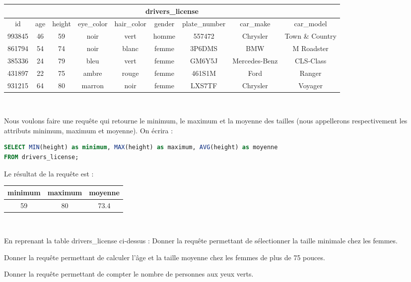 \begin{center}\begin{tabular}{|c c c c c c c c c|}
\hline
\multicolumn{9}{|c|}{\textbf{drivers\_license}} \\
\hline
    id & age & height & eye\_color & hair\_color & gender & plate\_number & car\_make & car\_model \\
    \hline
    \hline
    993845	&46	&59	&noir	&vert	&homme	&557472	&Chrysler	&Town \& Country\\
    861794	&54	&74	&noir	&blanc	&femme	&3P6DMS	&BMW	&M Roadster\\
385336	&24	&79	&bleu	&vert	&femme	&GM6Y5J	&Mercedes-Benz	&CLS-Class   \\
431897	&22	&75	&ambre	&rouge	&femme	&461S1M	&Ford	&Ranger\\
931215	&64	&80	&marron	&noir	&femme	&LXS7TF	&Chrysler	&Voyager\\
\hline

\hline
\end{tabular}\\    
\end{center}
Nous voulons faire une requête qui retourne le minimum, le maximum et la moyenne des tailles (nous appellerons respectivement les attributs minimum, maximum et moyenne).
On écrira :
\begin{lstlisting}[style=SQLstyle, language=SQL]
SELECT MIN(height) as minimum, MAX(height) as maximum, AVG(height) as moyenne
FROM drivers_license;
\end{lstlisting}

Le résultat de la requête est :
\begin{center}
\begin{tabular}{| c c c |}
    \hline
    minimum & maximum & moyenne \\
    \hline
    \hline
    59 & 80 & 73.4\\
    \hline
\end{tabular}\\    
\end{center}


\begin{Exercise}
    En reprenant la table drivers\_license ci-dessus :
    \Question Donner la requête permettant de sélectionner la taille minimale chez les femmes.\\
    \emptybox{2cm}
    
    \Question Donner la requête permettant de calculer l'âge et la taille moyenne chez les femmes de plus de 75 pouces.\\
    \emptybox{2cm}

    \Question Donner la requête permettant de compter le nombre de personnes aux yeux verts.\\
    \emptybox{2cm}
\end{Exercise} 

